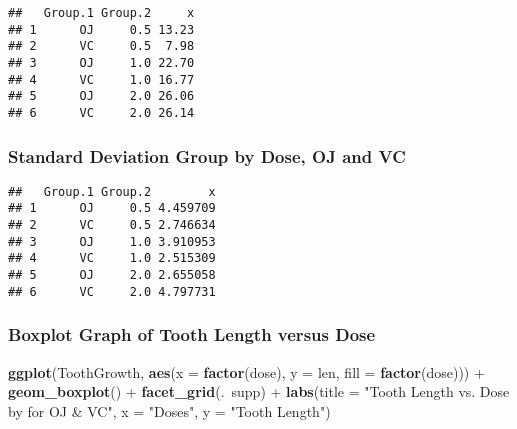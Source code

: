 \documentclass[]{article}
\newenvironment{Shaded}{\begin{snugshade}}{\end{snugshade}}
\newcommand{\KeywordTok}[1]{\textcolor[rgb]{0.13,0.29,0.53}{\textbf{{#1}}}}
\newcommand{\DataTypeTok}[1]{\textcolor[rgb]{0.13,0.29,0.53}{{#1}}}
\newcommand{\StringTok}[1]{\textcolor[rgb]{0.31,0.60,0.02}{{#1}}}
\newcommand{\NormalTok}[1]{{#1}}
\begin{document}
\begin{Shaded}
\end{Shaded}

\begin{verbatim}
##   Group.1 Group.2     x
## 1      OJ     0.5 13.23
## 2      VC     0.5  7.98
## 3      OJ     1.0 22.70
## 4      VC     1.0 16.77
## 5      OJ     2.0 26.06
## 6      VC     2.0 26.14
\end{verbatim}

\subsubsection{Standard Deviation Group by Dose, OJ and
VC}\label{standard-deviation-group-by-dose-oj-and-vc}

\begin{Shaded}
\end{Shaded}

\begin{verbatim}
##   Group.1 Group.2        x
## 1      OJ     0.5 4.459709
## 2      VC     0.5 2.746634
## 3      OJ     1.0 3.910953
## 4      VC     1.0 2.515309
## 5      OJ     2.0 2.655058
## 6      VC     2.0 4.797731
\end{verbatim}

\subsubsection{Boxplot Graph of Tooth Length versus
Dose}\label{boxplot-graph-of-tooth-length-versus-dose}

\begin{Shaded}
\begin{Highlighting}[]
\KeywordTok{ggplot}\NormalTok{(ToothGrowth, }\KeywordTok{aes}\NormalTok{(}\DataTypeTok{x =} \KeywordTok{factor}\NormalTok{(dose), }\DataTypeTok{y =} \NormalTok{len, }\DataTypeTok{fill =} \KeywordTok{factor}\NormalTok{(dose))) +}\StringTok{ }
\StringTok{        }\KeywordTok{geom_boxplot}\NormalTok{() +}\StringTok{ }\KeywordTok{facet_grid}\NormalTok{(.~supp) +}\StringTok{ }
\StringTok{        }\KeywordTok{labs}\NormalTok{(}\DataTypeTok{title =} \StringTok{"Tooth Length vs. Dose  by for OJ & VC"}\NormalTok{, }
             \DataTypeTok{x =} \StringTok{"Doses"}\NormalTok{, }\DataTypeTok{y =} \StringTok{"Tooth Length"}\NormalTok{)}
\end{Highlighting}
\end{Shaded}
\end{document}
